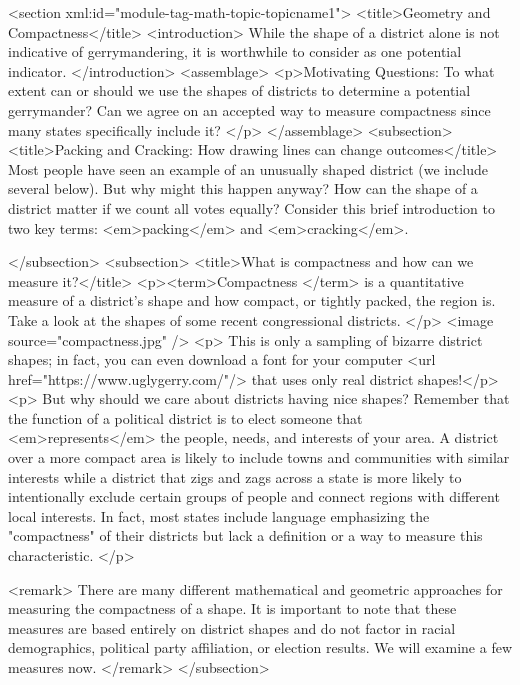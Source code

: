 <section xml:id="module-tag-math-topic-topicname1">
	<title>Geometry and Compactness</title>
		<introduction> While the shape of a district alone is not indicative of gerrymandering, it is worthwhile to consider as one potential indicator. </introduction>
				<assemblage>
					<p>Motivating Questions: To what extent can or should we use the shapes of districts to determine a potential gerrymander?
 Can we agree on an accepted way to measure compactness since many states specifically include it?
</p>
				</assemblage>
<subsection> <title>Packing and Cracking: How drawing lines can change outcomes</title>
Most people have seen an example of an unusually shaped district (we include several below). But why might this happen anyway? How can the shape of a district matter if we count all votes equally? Consider this brief introduction to two key terms: <em>packing</em> and <em>cracking</em>.

</subsection>
			<subsection>
			<title>What is compactness and how can we measure it?</title>
			<p><term>Compactness </term> is a quantitative measure of a district's shape and how compact, or tightly packed, the region is. Take a look at the shapes of some recent congressional districts. </p>
			<image source="compactness.jpg" />
		<p> This is only a sampling of bizarre district shapes; in fact, you can even download a font for your computer          <url href="https://www.uglygerry.com/"/> that uses only real district shapes!</p>
<p>  But why should we care about districts having nice shapes? Remember that the function of a political district is to elect someone that <em>represents</em> the people, needs, and interests of your area. A district over a more compact area is likely to include towns and communities with similar interests while a district that zigs and zags across a state is more likely to intentionally exclude certain groups of people and connect regions with different local interests. In fact, most states include language emphasizing the "compactness" of their districts but lack a definition or a way to measure this characteristic. </p>

<remark> There are many different mathematical and geometric approaches for measuring the compactness of a shape. It is important to note that these measures are based entirely on district shapes and do not factor in racial demographics, political party affiliation, or election results. We will examine a few measures now. </remark>
</subsection>

